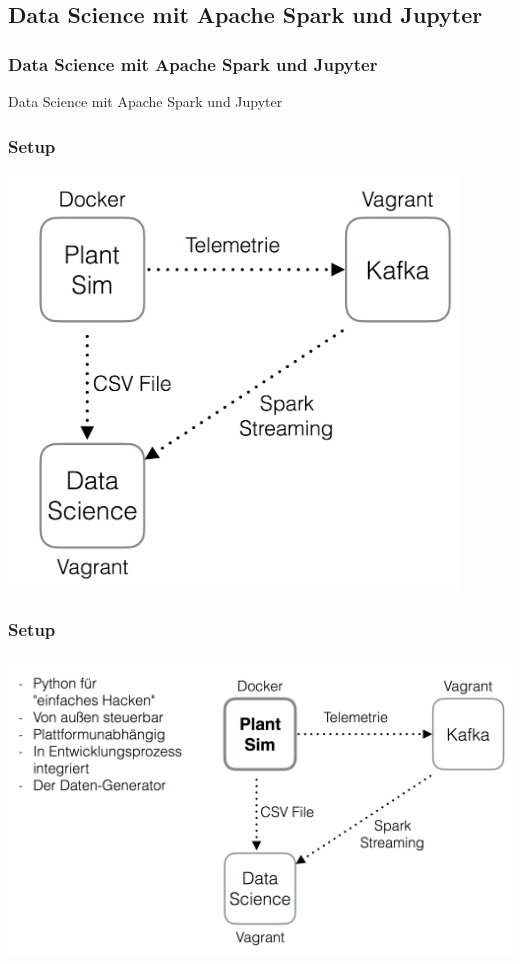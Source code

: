 \subsection{Data Science mit Apache Spark und Jupyter}

\begin{frame}
\frametitle{Data Science mit Apache Spark und Jupyter}
  \huge Data Science mit Apache Spark und Jupyter
\end{frame}

\begin{frame}
\frametitle{Setup}
  \center
  \includegraphics[width=0.9\textwidth,
  keepaspectratio=true]{bilder/data_science_blank.png}
\end{frame}

\begin{frame}
\frametitle{Setup}
  \center
  \includegraphics[width=1\textwidth,
  keepaspectratio=true]{bilder/data_science_sim.png}
\end{frame}

